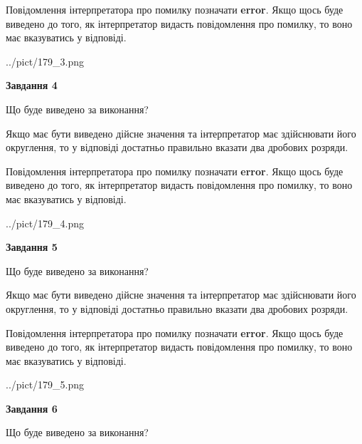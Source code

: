 \documentclass[12pt, ukrainian]{article}
\begin{document}
{\begin {Large}
Повідомлення інтерпретатора про помилку позначати \textbf{error}.
Якщо щось буде виведено до того, як інтерпретатор видасть повідомлення про помилку, 
то воно має вказуватись у відповіді. \par

\begin{center}
	{../pict/179_3.png}
\end{center}
\newpage

{\begin {center}\textbf{Завдання 4}\end {center}}\par
Що буде виведено за виконання? \par

Якщо має бути виведено дійсне значення та інтерпретатор має здійснювати його округлення, 
то у відповіді достатньо правильно вказати два дробових розряди.

Повідомлення інтерпретатора про помилку позначати \textbf{error}.
Якщо щось буде виведено до того, як інтерпретатор видасть повідомлення про помилку, 
то воно має вказуватись у відповіді. \par

\begin{center}
	{../pict/179_4.png}
\end{center}
\newpage

{\begin {center}\textbf{Завдання 5}\end {center}}\par
Що буде виведено за виконання? \par

Якщо має бути виведено дійсне значення та інтерпретатор має здійснювати його округлення, 
то у відповіді достатньо правильно вказати два дробових розряди.

Повідомлення інтерпретатора про помилку позначати \textbf{error}.
Якщо щось буде виведено до того, як інтерпретатор видасть повідомлення про помилку, 
то воно має вказуватись у відповіді. \par

\begin{center}
	{../pict/179_5.png}
\end{center}
\newpage

{\begin {center}\textbf{Завдання 6}\end {center}}\par
Що буде виведено за виконання? \par


\end{Large}}
\end{document}
